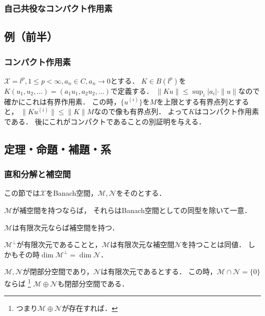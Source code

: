 \documentclass[a4j]{jsarticle}
\newcommand{\spX}{\mathscr{X}}
\newcommand{\spM}{\mathscr{M}}
\newcommand{\spN}{\mathscr{N}}
\begin{document}
    \subsubsection{自己共役なコンパクト作用素}

    \subsection{例（前半）}
    \subsubsection{コンパクト作用素}
    \begin{Example}[問, p.258]
        $\spX=l^p, 1 \leq p<\infty, a_n \in C, a_n \to 0$とする．
        $K \in B(l^p)$を$K(u_1,u_2,\dots)=(a_1u_1,a_2u_2,\dots)$で定義する．
        $\|Ku\| \leq \sup_i|a_i| \cdot \|u\|$なので確かにこれは有界作用素．
        この時，$\{u^{(i)}\}$を$M$を上限とする有界点列とすると，
        $\|K u^{(i)}\| \leq \|K\|M$なので像も有界点列．
        よって$K$はコンパクト作用素である．
        後にこれがコンパクトであることの別証明を与える．
    \end{Example}

    \newpage
    \subsection{定理・命題・補題・系}
    \subsubsection{直和分解と補空間}
    この節では$\spX$をBanach空間，$\spM,\spN$をそのとする．
    \begin{Thm}[定理11.2, p.252] \label{them1102}
        $\spM$が補空間を持つならば，
        それらはBanach空間としての同型を除いて一意．
    \end{Thm}
    \begin{Thm}[定理11.3, p.253] \label{them1103}
        $\spM$は有限次元ならば補空間を持つ．
    \end{Thm}
    \begin{Thm}[定理11.4, p.253] \label{them1104}
        $\spM^{\perp}$が有限次元であることと，$\spM$は有限次元な補空間$\spN$を持つことは同値．
        しかもその時$\dim \spM^{\perp}=\dim \spN$．
    \end{Thm}
    \begin{Thm}[定理11.7, p.255] \label{them1107}
        $\spM,\spN$が閉部分空間であり，$\spN$は有限次元であるとする．
        この時，$\spM \cap \spN=\{0\}$ならば
        \footnote{つまり$\spM \oplus \spN$が存在すれば．}
        $\spM \oplus \spN$も閉部分空間である．
    \end{Thm}
\end{document}
